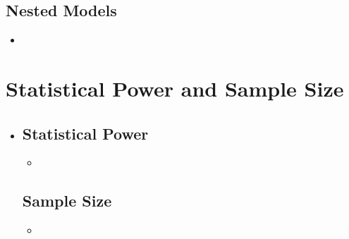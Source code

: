 \begin{itemize}
  \subsection{Nested Models}
  \begin{itemize}
    \item 
  \end{itemize}
  
\end{itemize}

\section{Statistical Power and Sample Size}
\begin{itemize}
  \item []
  
  \subsection{Statistical Power}
  \begin{itemize}
    \item 
  \end{itemize}

  \subsection{Sample Size}
  \begin{itemize}
    \item 
  \end{itemize}
  
\end{itemize}
